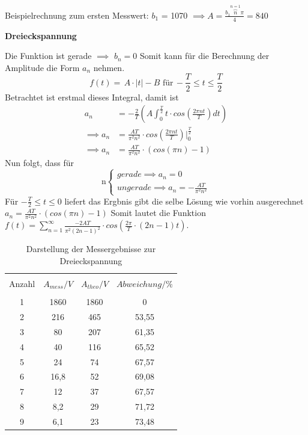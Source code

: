 Beispielrechnung zum ersten Messwert: $b_1$ = 1070 $\implies A =\frac{b_1 \overbrace{n}^{n=1} \pi}{4}= 840$\\
\centerline{\textbf{Dreieckspannung}}
Die Funktion ist gerade $\implies$ $b_n = 0$
Somit kann für die Berechnung der Amplitude die Form $a_n$ nehmen.
\begin{equation*}
  f(t)= \, A\cdot |t| - B \,\, \text{für} \, -\frac{T}{2} \leq t \leq \frac{T}{2}
\end{equation*}
Betrachtet ist erstmal dieses Integral, damit ist
\begin{align*}
  a_n &= -\frac{2}{T} (A \int_{0}^\frac{T}{2} t \cdot cos(\frac{2\pi nt}{T})dt)\\
  \implies a_n &= \frac{AT}{\pi^2 n^2} \cdot cos(\frac{2\pi nt}{T})\biggl|_{0}^\frac{T}{2}\\
  \implies a_n &= \frac{AT}{\pi^2 n^2} \cdot (cos(\pi n)-1)
\end{align*}
Nun folgt, dass für
\begin{equation*}
  \text{n}
  \begin{cases}
    gerade \implies a_n = 0 \,\, \\
    ungerade \implies a_n = -\frac{AT}{\pi^2 n^2}
  \end{cases}
\end{equation*}
Für $-\frac{T}{2} \leq t \leq 0$ liefert
das Ergbnis gibt die selbe Lösung wie vorhin ausgerechnet $a_n = \frac{AT}{\pi^2 n^2} \cdot (cos(\pi n)-1)$
Somit lautet die Funktion $f(t) = \sum^{\infty}_{n=1} \frac{-2AT}{\pi^2 (2n-1)^2} \cdot cos(\frac{2\pi}{T}\cdot(2n-1)t)$.
\begin{table}[H]
  \centering
  \begin{tabular}{c c c c}
    \toprule\\
    Anzahl & $A_{mess} / V$ & $A_{theo} / V$ & $Abweichung / \% $\\
    \midrule \\
    1 & 1860 & 1860 & 0\\
    2 & 216 & 465 & 53,55\\
    3 & 80 & 207 &  61,35\\
    4 & 40 & 116 &  65,52\\
    5 & 24 & 74 &   67,57\\
    6 & 16,8 & 52 & 69,08\\
    7 & 12 & 37 &   67,57\\
    8 & 8,2 & 29 &  71,72\\
    9 & 6,1 & 23 &  73,48\\
    \bottomrule
  \end{tabular}
  \caption{Darstellung der Messergebnisse zur Dreieckspannung}
  \label{tab:2}
\end{table}
